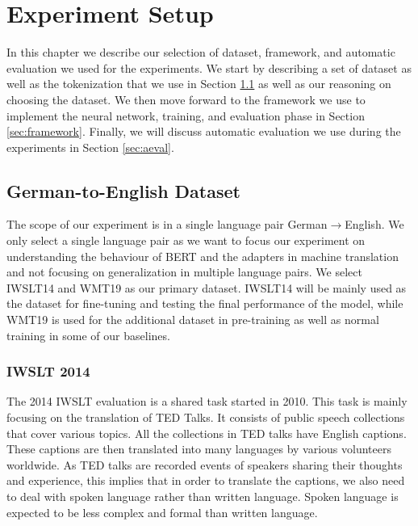 
\chapter{Experiment Setup}
\label{chap:03}
In this chapter we describe our selection of dataset, framework, and automatic evaluation we used for the experiments. We start by describing a set of dataset as well as the tokenization that we use in Section \ref{sec:dataset} as well as our reasoning on choosing the dataset. We then move forward to the framework we use to implement the neural network, training, and evaluation phase in Section \ref{sec:framework}. Finally, we will discuss automatic evaluation we use during the experiments in Section \ref{sec:aeval}.

\section{German-to-English Dataset}
\label{sec:dataset}
The scope of our experiment is in a single language pair German$\rightarrow$English. We only select a single language pair as we want to focus our experiment on understanding the behaviour of BERT and the adapters in machine translation and not focusing on generalization in multiple language pairs. We select IWSLT14 and WMT19 as our primary dataset. IWSLT14 will be mainly used as the dataset for fine-tuning and testing the final performance of the model, while WMT19 is used for the additional dataset in pre-training as well as normal training in some of our baselines.

\subsection{IWSLT 2014}
The 2014 IWSLT evaluation \cite{Cettolo2014ReportOT} is a shared task started in 2010. This task is mainly focusing on the translation of TED Talks. It consists of public speech collections that cover various topics. All the collections in TED talks have English captions. These captions are then translated into many languages by various volunteers worldwide. As TED talks are recorded events of speakers sharing their thoughts and experience, this implies that in order to translate the captions, we also need to deal with spoken language rather than written language. Spoken language is expected to be less complex and formal than written language.

